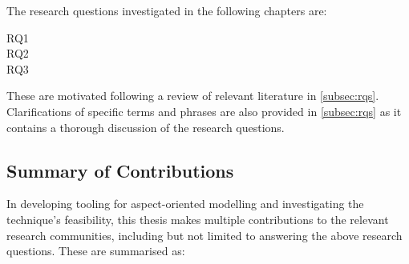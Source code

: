 The research questions investigated in the following chapters are: 

\begin{researchquestion}
\begin{description}
\item[RQ1] \rqone{}
\item[RQ2] \rqtwo{}
\item[RQ3] \rqthree{}
\end{description}
\end{researchquestion}

These are motivated following a review of relevant literature in
\cref{subsec:rqs}. Clarifications of specific terms and phrases are also
provided in \cref{subsec:rqs} as it contains a thorough discussion
of the research questions.

\subsection{Summary of Contributions}

In developing tooling for aspect-oriented modelling and investigating the
technique's feasibility, this thesis makes multiple contributions to the
relevant research communities, including but not limited to answering the above
research questions. These are summarised as:

